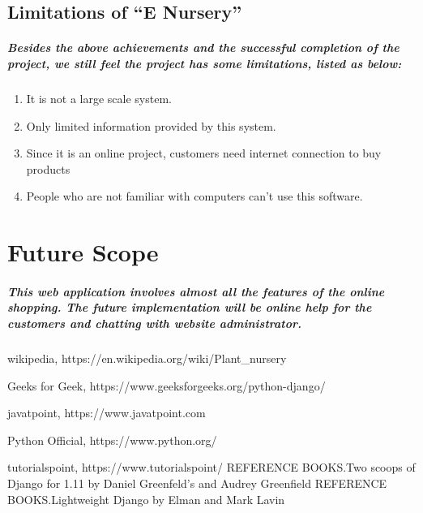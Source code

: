 \documentclass[12pt,a4paper]{report}
\begin{document}
		\section{Limitations of  “E Nursery”}
		\paragraph
		{
			Besides the above achievements and the successful completion of the project, we still feel the project has some limitations, listed as below:
		}
		        
		\begin{enumerate}
			\item It is not a large scale system. 
			\item Only limited information provided by this system. 
			\item Since it is an online project, customers need internet connection to buy products
			\item People who are not familiar with computers can’t use this software.
		\end{enumerate}
		\chapter{Future Scope}
		\paragraph
		{
			This web application involves almost all the features of the online shopping. The future implementation will be online help for the customers and chatting with website administrator.
		}
		    
		\begin{thebibliography}{20}
			
			 wikipedia, https://en.wikipedia.org/wiki/Plant\_nursery
			    
			 Geeks for Geek, https://www.geeksforgeeks.org/python-django/
			    
			 javatpoint, https://www.javatpoint.com
			    
			 Python Official, https://www.python.org/
			    
			tutorialspoint,  https://www.tutorialspoint/
			  REFERENCE BOOKS.Two scoops of Django for 1.11 by Daniel Greenfeld’s and Audrey Greenfield
			  REFERENCE BOOKS.Lightweight Django by Elman and Mark Lavin
		\end{thebibliography}
\end{document}
